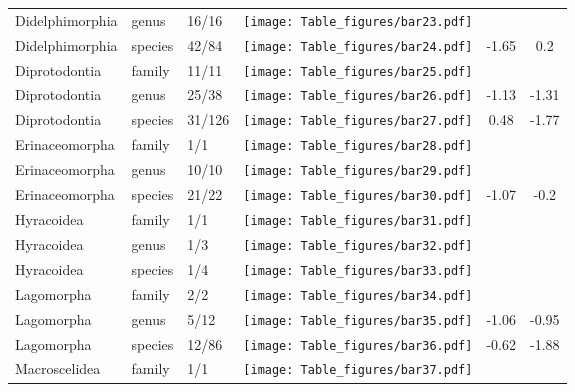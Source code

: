 \begin{longtable}{lL{1.8cm}C{2cm}lcc}
  Didelphimorphia & genus & 16/16 & \texttt{[image: Table\_figures/bar23.pdf]} &   &   \\ 
  Didelphimorphia & species & 42/84 & \texttt{[image: Table\_figures/bar24.pdf]} & -1.65 & 0.2 \\ 
  Diprotodontia & family & 11/11 & \texttt{[image: Table\_figures/bar25.pdf]} &   &   \\ 
  Diprotodontia & genus & 25/38 & \texttt{[image: Table\_figures/bar26.pdf]} & -1.13 & -1.31 \\ 
  Diprotodontia & species & 31/126 & \texttt{[image: Table\_figures/bar27.pdf]} & 0.48 & -1.77 \\ 
  Erinaceomorpha & family & 1/1 & \texttt{[image: Table\_figures/bar28.pdf]} &   &   \\ 
  Erinaceomorpha & genus & 10/10 & \texttt{[image: Table\_figures/bar29.pdf]} &   &   \\ 
  Erinaceomorpha & species & 21/22 & \texttt{[image: Table\_figures/bar30.pdf]} & -1.07 & -0.2 \\ 
  Hyracoidea & family & 1/1 & \texttt{[image: Table\_figures/bar31.pdf]} &   &   \\ 
  Hyracoidea & genus & 1/3 & \texttt{[image: Table\_figures/bar32.pdf]} &   &   \\ 
  Hyracoidea & species & 1/4 & \texttt{[image: Table\_figures/bar33.pdf]} &   &   \\ 
  Lagomorpha & family & 2/2 & \texttt{[image: Table\_figures/bar34.pdf]} &   &   \\ 
  Lagomorpha & genus & 5/12 & \texttt{[image: Table\_figures/bar35.pdf]} & -1.06 & -0.95 \\ 
  Lagomorpha & species & 12/86 & \texttt{[image: Table\_figures/bar36.pdf]} & -0.62 & -1.88 \\ 
  Macroscelidea & family & 1/1 & \texttt{[image: Table\_figures/bar37.pdf]} &   &   \\ 

\end{longtable}
